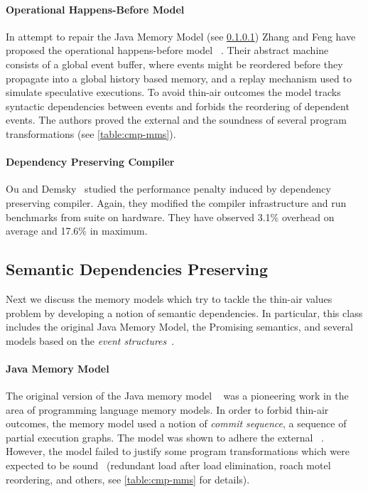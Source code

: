 \paragraph{Operational Happens-Before Model}

In attempt to repair the Java Memory Model (see \cref{sec:catalog:jmm})
Zhang and Feng have proposed the 
operational happens-before model \OHMM~\cite{Zhang-Feng:FCS16}.
Their abstract machine consists of a global event buffer,
where events might be reordered before they propagate into  
a global history based memory, and a replay mechanism 
used to simulate speculative executions. 
To avoid thin-air outcomes the model tracks syntactic dependencies 
between events and forbids the reordering of dependent events. 
The authors proved the external \DRF and 
the soundness of several program transformations
(see \cref{table:cmp-mms}). 

\paragraph{Dependency Preserving Compiler}

Ou and Demsky~\cite{Ou-Demsky:OOPSLA18} studied 
the performance penalty induced by dependency preserving compiler. 
Again, they modified the \LLVM compiler infrastructure 
and run benchmarks from \SPECCPU suite on  hardware. 
They have observed 3.1\% overhead on average and 17.6\% in maximum. 

\subsection{Semantic Dependencies Preserving}
\label{sec:catalog:sdeprf}

Next we discuss the memory models 
which try to tackle the thin-air values problem 
by developing a notion of semantic dependencies. 
In particular, this class includes the original Java Memory Model, 
the Promising semantics, and several models based 
on the \emph{event structures}~\cite{Winskel:86}.

\paragraph{Java Memory Model}
\label{sec:catalog:jmm}

The original version of the Java memory model \JMM~\cite{Manson-al:POPL05}
was a pioneering work in the area of programming language memory models. 
In order to forbid thin-air outcomes, the memory model used 
a notion of \emph{commit sequence}, \ie a sequence of partial execution graphs.
The model was shown to adhere the external \DRF~\cite{Huisman-Petri:CONCUR07}.
However, the model failed to justify some program transformations 
which were expected to be sound~\cite{Sevcik-Aspinall:ECOOP08} 
(\eg redundant load after load elimination, roach motel reordering, and others,
see \cref{table:cmp-mms} for details). 

